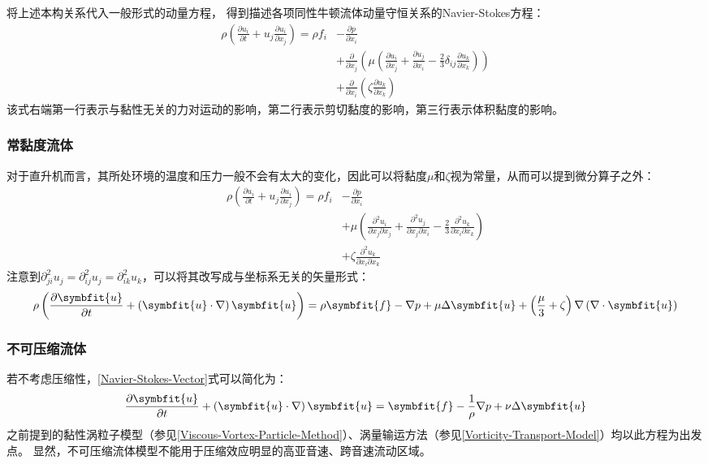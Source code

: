 \documentclass[doctor,openright,twoside,color]{buaathesis}
\begin{document}
将上述本构关系代入一般形式的动量方程，
得到描述各项同性牛顿流体动量守恒关系的Navier-Stokes方程：
\begin{equation}\label{Navier-Stokes}
\begin{split}
\rho\left( \frac{\partial u_i }{\partial t} + u_j \frac{\partial u_i}{\partial x_j}  \right)
= \rho f_i
& - \frac{\partial p }{\partial x_i} \\
& + \frac{ \partial }{\partial x_j} \left( \mu \left( \frac{\partial u_i}{\partial x_j} + \frac{\partial u_j}{\partial x_i} - \frac{2}{3} \delta_{ij} \frac{\partial u_k}{\partial x_k} \right) \right) \\
& + \frac{ \partial }{\partial x_i} \left( \zeta \frac{\partial u_k}{\partial x_k} \right)
\end{split}
\end{equation}
该式右端第一行表示与黏性无关的力对运动的影响，第二行表示剪切黏度的影响，第三行表示体积黏度的影响。

\subsubsection{常黏度流体}
对于直升机而言，其所处环境的温度和压力一般不会有太大的变化，因此可以将黏度$\mu$和$\zeta$视为常量，从而可以提到微分算子之外：
\begin{equation}
\begin{split}
\rho\left( \frac{\partial u_i }{\partial t} + u_j \frac{\partial u_i}{\partial x_j}  \right)
= \rho f_i
& - \frac{\partial p }{\partial x_i} \\
& + \mu \left( \frac{ \partial^2 u_i }{\partial x_j \partial x_j } +
                        \frac{ \partial^2 u_j }{\partial x_j \partial x_i } -
                        \frac{2}{3} \frac{\partial^2 u_k}{\partial x_i \partial x_k} \right) \\
& + \zeta \frac{\partial^2 u_k}{\partial x_i \partial x_k}
\end{split}
\end{equation}
注意到$\partial^2_{ji} u_j = \partial^2_{ij} u_j =\partial^2_{ik} u_k$，可以将其改写成与坐标系无关的矢量形式：
\begin{equation}\label{Navier-Stokes-Vector}
\rho \left( \frac{\partial \symbfit{u}}{\partial t} + \left(\symbfit{u}\cdot\nabla\right) \symbfit{u} \right)
=
\rho \symbfit{f}
-\nabla p
+\mu \Delta \symbfit{u}
+\left( \frac{\mu}{3} + \zeta \right) \nabla  \left(\nabla\cdot\symbfit{u}\right)
\end{equation}

\subsubsection{不可压缩流体}
若不考虑压缩性，\ref{Navier-Stokes-Vector}式可以简化为：
\begin{equation}
\frac{\partial \symbfit{u}}{\partial t} + \left(\symbfit{u}\cdot\nabla\right) \symbfit{u}
= \symbfit{f} -\frac{1}{\rho}\nabla p + \nu \Delta \symbfit{u}
\end{equation}
之前提到的黏性涡粒子模型（参见\ref{Viscous-Vortex-Particle-Method}）、涡量输运方法（参见\ref{Vorticity-Transport-Model}）均以此方程为出发点。
显然，不可压缩流体模型不能用于压缩效应明显的高亚音速、跨音速流动区域。
\end{document}
